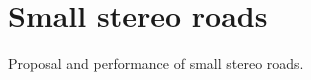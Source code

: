 \section{Small stereo roads}
\label{sec:stereoroads}

Proposal and performance of small stereo roads.


